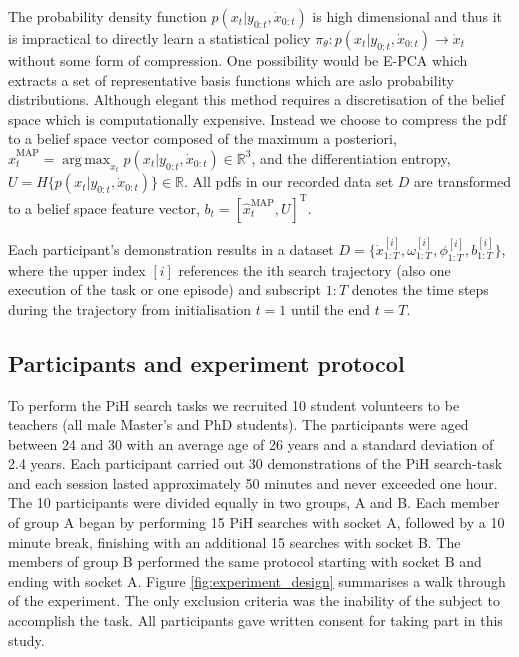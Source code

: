 \documentclass[final,3p,times,twocolumn]{elsarticle}
\DeclareMathOperator*{\argmax}{arg\,max}
\begin{document}
The probability density function $p(x_t|y_{0:t},\dot{x}_{0:t})$ is high dimensional and thus it is 
impractical to directly learn a statistical policy $\pi_{\theta} : p(x_t|y_{0:t},\dot{x}_{0:t}) \rightarrow \dot{x}_t$
without some form of compression. One possibility would be E-PCA \cite{NIPS2002_2319} which extracts a set of 
representative basis functions which are aslo probability distributions. Although elegant this method 
requires a discretisation of the belief space which is computationally expensive. Instead we choose to 
compress the pdf to a belief space vector composed of the maximum a posteriori, $\hat{x}^{\mathrm{MAP}}_t = \argmax_{x_t} p(x_t|y_{0:t},\dot{x}_{0:t}) \in \mathbb{R}^3$, and the differentiation entropy, 
$U = H\{p(x_t|y_{0:t},\dot{x}_{0:t})\} \in \mathbb{R}$. All pdfs in our recorded data set $D$ are transformed to 
a belief space feature vector, $b_t = [\hat{x}^{\mathrm{MAP}}_t,U]^{\mathrm{T}}$. 

Each participant's demonstration results in a dataset $D=\{\dot{x}^{[i]}_{1:T},\omega^{[i]}_{1:T},\phi^{[i]}_{1:T},b^{[i]}_{1:T}\}$, 
where the upper index $[i]$ references the ith search trajectory (also one execution of the task or one episode) and 
subscript $1:T$ denotes the time steps during the trajectory from initialisation $t=1$ until the end $t=T$. 

\subsection{Participants and experiment protocol}

To perform the PiH search tasks we recruited 10 student volunteers to be teachers (all male Master's and PhD students).
The participants were aged between 24 and 30 with an average age of 26 years and a standard deviation of 2.4 years.
Each participant carried out 30 demonstrations of the PiH search-task and each session lasted approximately 50 minutes and 
never exceeded one hour. The 10 participants were divided equally in two groups, A and B. Each member of group A began 
by performing 15 PiH searches with socket A, followed by a 10 minute break, finishing with an additional 15 searches with socket B. 
The members of group B performed the same protocol starting with socket B and ending with socket A.
Figure \ref{fig:experiment_design} summarises a walk through of the experiment.
The only exclusion criteria was the inability of the subject to accomplish the task. All participants gave written consent 
for taking part in this study.
\end{document}
